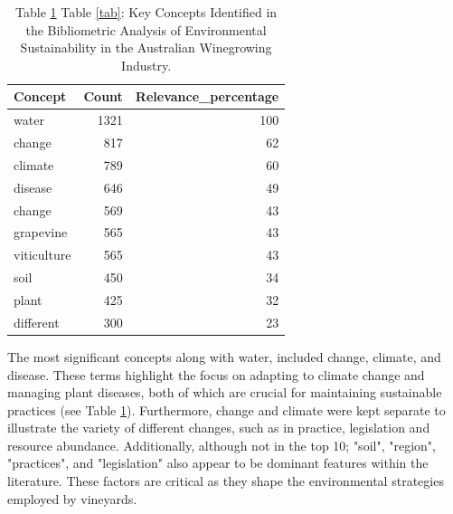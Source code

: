 
\begin{table}[h]\label{tab:lexi}
    \caption{Table \ref{tab:lexi} Table \ref{tab}: Key Concepts Identified in the Bibliometric Analysis of Environmental Sustainability in the Australian Winegrowing Industry.}
    \begin{tabular}{@{}lrr@{}}
    \toprule
    \textbf{Concept} & \multicolumn{1}{l}{\textbf{Count}} & \multicolumn{1}{l}{\textbf{Relevance_percentage}} \\ \midrule
    water & 1321 & 100 \\
    change & 817 & 62 \\
    climate & 789 & 60 \\
    disease & 646 & 49 \\
    change & 569 & 43 \\
    grapevine & 565 & 43 \\
    viticulture & 565 & 43 \\
    soil & 450 & 34 \\
    plant & 425 & 32 \\
    different & 300 & 23 \\ \bottomrule
    \end{tabular}
    \end{table}

% 

The most significant concepts along with water, included change, climate, and disease. These terms highlight the focus on adapting to climate change and managing plant diseases, both of which are crucial for maintaining sustainable practices (see Table \ref{tab:lexi}). Furthermore, change and climate were kept separate to illustrate the variety of different changes, such as in practice, legislation and resource abundance. Additionally, although not in the top 10; "soil", "region", "practices", and "legislation" also appear to be dominant features within the literature. These factors are critical as they shape the environmental strategies employed by vineyards.


